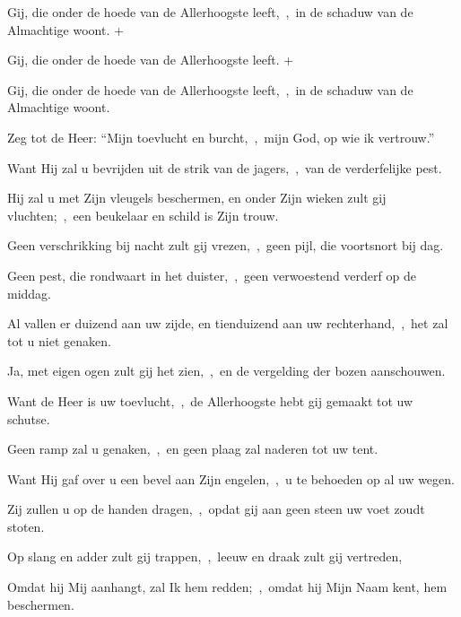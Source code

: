 \documentclass[12pt,twoside,a5paper]{article}
\begin{document}
\begin{halfparskip}

  \begin{exceptionalexception}
      Gij, die onder de hoede van de Allerhoogste leeft,~\sep\ in de schaduw van de Almachtige woont. + 
  \end{exceptionalexception}

    Gij, die onder de hoede van de Allerhoogste leeft. + 

   Gij, die onder de hoede van de Allerhoogste leeft,~\sep\ in de schaduw van de Almachtige woont.

  Zeg tot de Heer: ``Mijn toevlucht en burcht,~\sep\ mijn God, op wie ik vertrouw.''

  Want Hij zal u bevrijden uit de strik van de jagers,~\sep\ van de verderfelijke pest.

  Hij zal u met Zijn vleugels beschermen, en onder Zijn wieken zult gij vluchten;~\sep\ een beukelaar en schild is Zijn trouw.

  Geen verschrikking bij nacht zult gij vrezen,~\sep\ geen pijl, die voortsnort bij dag.

  Geen pest, die rondwaart in het duister,~\sep\ geen verwoestend verderf op de middag.

  Al vallen er duizend aan uw zijde, en tienduizend aan uw rechterhand,~\sep\ het zal tot u niet genaken.

  Ja, met eigen ogen zult gij het zien,~\sep\ en de vergelding der bozen aanschouwen.

  Want de Heer is uw toevlucht,~\sep\ de Allerhoogste hebt gij gemaakt tot uw schutse.

  Geen ramp zal u genaken,~\sep\ en geen plaag zal naderen tot uw tent.

  Want Hij gaf over u een bevel aan Zijn engelen,~\sep\ u te behoeden op al uw wegen.

  Zij zullen u op de handen dragen,~\sep\ opdat gij aan geen steen uw voet zoudt stoten.

  Op slang en adder zult gij trappen,~\sep\ leeuw en draak zult gij vertreden,

  Omdat hij Mij aanhangt, zal Ik hem redden;~\sep\ omdat hij Mijn Naam kent, hem beschermen.


\end{halfparskip}
\end{document}
